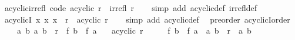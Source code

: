 \begin{isabellebody}
\isanewline
{}\isamarkupfalse%
\ acyclic{\isacharunderscore}{\kern0pt}irrefl\ {\isacharbrackleft}{\kern0pt}code{\isacharbrackright}{\kern0pt}{\isacharcolon}{\kern0pt}\ {\isachardoublequoteopen}acyclic\ r\ {\isasymlongleftrightarrow}\ irrefl\ {\isacharparenleft}{\kern0pt}r\isactrlsup {\isacharplus}{\kern0pt}{\isacharparenright}{\kern0pt}{\isachardoublequoteclose}\isanewline
%
\isadelimproof
\ \ %
\endisadelimproof
%
\isatagproof
{}\isamarkupfalse%
\ {\isacharparenleft}{\kern0pt}simp\ add{\isacharcolon}{\kern0pt}\ acyclic{\isacharunderscore}{\kern0pt}def\ irrefl{\isacharunderscore}{\kern0pt}def{\isacharparenright}{\kern0pt}%
\endisatagproof
{\isafoldproof}%
%
\isadelimproof
\isanewline
%
\endisadelimproof
\isanewline
{}\isamarkupfalse%
\ acyclicI{\isacharcolon}{\kern0pt}\ {\isachardoublequoteopen}{\isasymforall}x{\isachardot}{\kern0pt}\ {\isacharparenleft}{\kern0pt}x{\isacharcomma}{\kern0pt}\ x{\isacharparenright}{\kern0pt}\ {\isasymnotin}\ r\isactrlsup {\isacharplus}{\kern0pt}\ {\isasymLongrightarrow}\ acyclic\ r{\isachardoublequoteclose}\isanewline
%
\isadelimproof
\ \ %
\endisadelimproof
%
\isatagproof
{}\isamarkupfalse%
\ {\isacharparenleft}{\kern0pt}simp\ add{\isacharcolon}{\kern0pt}\ acyclic{\isacharunderscore}{\kern0pt}def{\isacharparenright}{\kern0pt}%
\endisatagproof
{\isafoldproof}%
%
\isadelimproof
\isanewline
%
\endisadelimproof
\isanewline
{}\isamarkupfalse%
\ {\isacharparenleft}{\kern0pt}\ preorder{\isacharparenright}{\kern0pt}\ acyclicI{\isacharunderscore}{\kern0pt}order{\isacharcolon}{\kern0pt}\isanewline
\ \ \ {\isacharasterisk}{\kern0pt}{\isacharcolon}{\kern0pt}\ {\isachardoublequoteopen}{\isasymAnd}a\ b{\isachardot}{\kern0pt}\ {\isacharparenleft}{\kern0pt}a{\isacharcomma}{\kern0pt}\ b{\isacharparenright}{\kern0pt}\ {\isasymin}\ r\ {\isasymLongrightarrow}\ f\ b\ {\isacharless}{\kern0pt}\ f\ a{\isachardoublequoteclose}\isanewline
\ \ \ {\isachardoublequoteopen}acyclic\ r{\isachardoublequoteclose}\isanewline
%
\isadelimproof
%
\endisadelimproof
%
\isatagproof
{}\isamarkupfalse%
\ {\isacharminus}{\kern0pt}\isanewline
\ \ \isamarkupfalse%
\ {\isachardoublequoteopen}f\ b\ {\isacharless}{\kern0pt}\ f\ a{\isachardoublequoteclose}\ \ {\isachardoublequoteopen}{\isacharparenleft}{\kern0pt}a{\isacharcomma}{\kern0pt}\ b{\isacharparenright}{\kern0pt}\ {\isasymin}\ r\isactrlsup {\isacharplus}{\kern0pt}{\isachardoublequoteclose}\ \ a\ b\isanewline
\ \ \ \ \isamarkupfalse%

\end{isabellebody}
